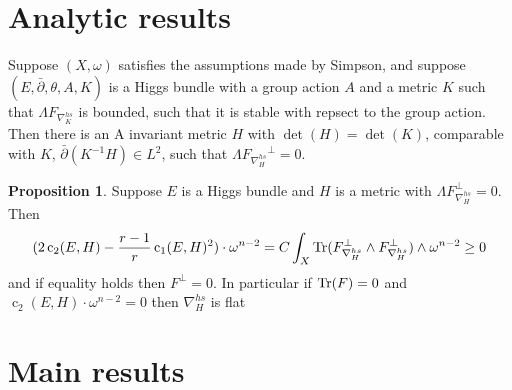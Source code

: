 \documentclass[aspectratio=169, 10pt]{beamer}
\theoremstyle{definition}
\theoremstyle{example}
\newtheorem{proposition}[theorem]{Proposition}
\begin{document}
\section{Analytic results}
\begin{frame}
	\begin{theorem}\label{t1}
		Suppose $(X,\omega)$ satisfies the assumptions made by Simpson, and suppose $(E,\bar{\partial},\theta, A, K)$ is a Higgs bundle with a group action $A$ and a metric $K$ such that $\Lambda F_{\nabla_{K}^{hs}}$ is bounded, such that it is stable with repsect to the group action. Then there is an A invariant metric $H$ with $\det(H)=\det(K)$, comparable with $K$, $\bar{\partial}(K^{-1}H)\in L^2$, such that $\Lambda {F_{\nabla_{H}^{hs}}}^{\perp}=0$.
	\end{theorem}
	\begin{proposition}\label{prop3.4}
		Suppose $E$ is a Higgs bundle and $H$ is a metric with $\Lambda F_{\nabla_H^{hs}}^{\perp}=0$. Then 
		\[
		(2\operatorname{c}_2(E,H)-\frac{r-1}{r}\operatorname{c}_1(E,H)^2)\cdot \omega^{n-2}=C\int_X \operatorname{Tr}(F_{\nabla_H^{hs}}^{\perp}\wedge F_{\nabla_H^{hs}}^{\perp})\wedge \omega^{n-2}\geq 0
		\]
		and if equality holds then $F^{\perp}=0$. In particular if $\operatorname{Tr}(F)=0$ and $\operatorname{c}_2(E,H)\cdot \omega^{n-2}=0$ then $\nabla_{H}^{hs}$ is flat
		\end{proposition}
\end{frame}

\section{Main results}
\end{document}
